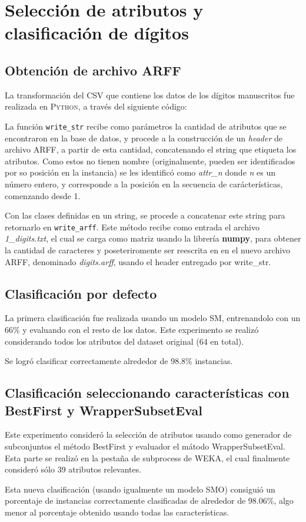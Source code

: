 \section{Selecci\'on de atributos y clasificaci\'on de d\'igitos}\label{sec4}

\subsection{Obtenci\'on de archivo ARFF}
La transformaci\'on del CSV que contiene los datos de los d\'igitos manuscritos fue realizada en \textsc{Python}, a trav\'es del siguiente c\'odigo:


La funci\'on \texttt{write\_str} recibe como par\'ametros la cantidad de atributos que se encontraron en la base de datos, y procede a la construcci\'on de un \textit{header} de archivo ARFF, a partir de esta cantidad, concatenando el string que etiqueta los atributos. Como estos no tienen nombre (originalmente, pueden ser identificados por so posici\'on en la instancia) se les identific\'o como \textit{attr\_n} donde \textit{n} es un n\'umero entero, y corresponde a la posici\'on en la secuencia de car\'acter\'isticas, comenzando desde 1.
\bigskip

Con las clases definidas en un string, se procede a concatenar este string para retornarlo en \texttt{write\_arff}. Este m\'etodo recibe como entrada el archivo \textit{1\_digits.txt}, el cual se carga como matriz usando la librer\'ia \textbf{numpy}, para obtener la cantidad de caracteres y poseteriromente ser reescrita en en el nuevo archivo ARFF, denominado \textit{digits.arff}, usando el header entregado por write\_str.
\subsection{Clasificaci\'on por defecto}
La primera clasificaci\'on fue realizada usando un modelo SM, entrenandolo con un 66\% y evaluando con el resto de los datos. Este experimento se realiz\'o considerando todos los atributos del dataset original (64 en total). 

Se logr\'o clasificar correctamente alrededor de 98.8\% instancias.
\subsection{Clasificaci\'on seleccionando caracter\'isticas con BestFirst y WrapperSubsetEval}
Este experimento consider\'o la selecci\'on de atributos usando como generador de subconjuntos el m\'etodo BestFirst y evaluador el m\'atodo WrapperSubsetEval. Esta parte se realiz\'o en la pesta\~na de subprocess de WEKA, el cual finalmente consider\'o s\'olo 39 atributos relevantes.


Esta nueva clasificaci\'on (usando igualmente un modelo SMO) consigui\'o un porcentaje de instancias correctamente clasificadas de alrededor de 98.06\%, algo menor al porcentaje obtenido usando todas las caracter\'isticas.